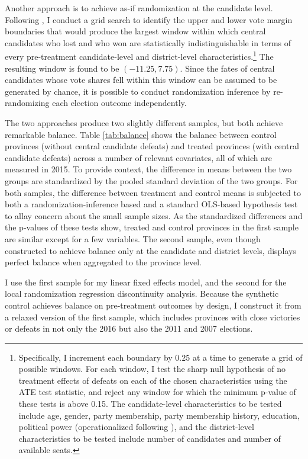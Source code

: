 \documentclass[12pt]{article}
\newcommand{\1}{\mathbbm{1}}
\begin{document}
Another approach is to achieve as-if randomization at the candidate level. Following \citet{CattaneoTitiunik2015}, I conduct a grid search to identify the upper and lower vote margin boundaries that would produce the largest window within which central candidates who lost and who won are statistically indistinguishable in terms of every pre-treatment candidate-level and district-level characteristics.\footnote{Specifically, I  increment each boundary by $0.25$ at a time to generate a grid of possible windows. For each window, I test the sharp null hypothesis of no treatment effects of defeats on each of the chosen characteristics using the ATE test statistic, and reject any window for which the minimum p-value of these tests is above 0.15. The candidate-level characteristics to be tested include age, gender, party membership, party membership history, education, political power (operationalized following \citet{MaleskySchuler2011}), and the district-level characteristics to be tested include number of candidates and number of available seats.} The resulting window is found to be $(-11.25, 7.75)$. Since the fates of central candidates whose vote shares fell within this window can be assumed to be generated by chance, it is possible to conduct randomization inference by re-randomizing each election outcome independently. 

The two approaches produce two slightly different samples, but both achieve remarkable balance. Table \ref{tab:balance} shows the balance between control provinces (without central candidate defeats) and treated provinces (with central candidate defeats) across a number of relevant covariates, all of which are measured in 2015. To provide context, the difference in means between the two groups are standardized by the pooled standard deviation of the two groups. For both samples, the difference between treatment and control means is subjected to both a randomization-inference based and a standard OLS-based hypothesis test to allay concern about the small sample sizes. As the standardized differences and the p-values of these tests show, treated and control provinces in the first sample are similar except for a few variables. The second sample, even though constructed to achieve balance only at the candidate and district levels, displays perfect balance when aggregated to the province level. 

I use the first sample for my linear fixed effects model, and the second for the local randomization regression discontinuity analysis. Because the synthetic control achieves balance on pre-treatment outcomes by design, I construct it from a relaxed version of the first sample, which includes provinces with close victories or defeats in not only the 2016 but also the 2011 and 2007 elections.
\end{document}
